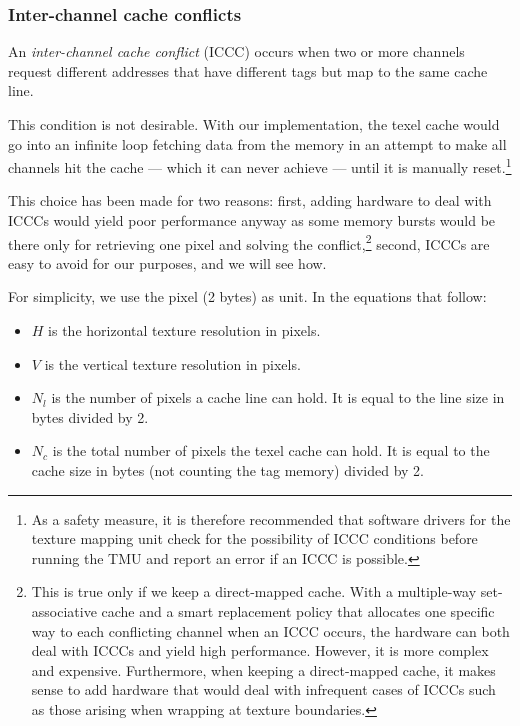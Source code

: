 \documentclass[a4paper,11pt]{kthesis}
\begin{document}
\subsubsection{Inter-channel cache conflicts}
An \textit{inter-channel cache conflict} (ICCC) occurs when two or more channels request different addresses that have different tags but map to the same cache line.

This condition is not desirable. With our implementation, the texel cache would go into an infinite loop fetching data from the memory in an attempt to make all channels hit the cache --- which it can never achieve --- until it is manually reset.\footnote{As a safety measure, it is therefore recommended that software drivers for the texture mapping unit check for the possibility of ICCC conditions before running the TMU and report an error if an ICCC is possible.}

This choice has been made for two reasons: first, adding hardware to deal with ICCCs would yield poor performance anyway as some memory bursts would be there only for retrieving one pixel and solving the conflict,\footnote{This is true only if we keep a direct-mapped cache. With a multiple-way set-associative cache and a smart replacement policy that allocates one specific way to each conflicting channel when an ICCC occurs, the hardware can both deal with ICCCs and yield high performance. However, it is more complex and expensive. Furthermore, when keeping a direct-mapped cache, it makes sense to add hardware that would deal with infrequent cases of ICCCs such as those arising when wrapping at texture boundaries.} second, ICCCs are easy to avoid for our purposes, and we will see how.

For simplicity, we use the pixel (2 bytes) as unit. In the equations that follow:
\begin{itemize}
\item $H$ is the horizontal texture resolution in pixels.
\item $V$ is the vertical texture resolution in pixels.
\item $N_{l}$ is the number of pixels a cache line can hold. It is equal to the line size in bytes divided by 2.
\item $N_{c}$ is the total number of pixels the texel cache can hold. It is equal to the cache size in bytes (not counting the tag memory) divided by 2.
\end{itemize}
\end{document}
